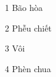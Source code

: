 \begin{loigiaiexh}{1}
 Bão hòa 
\end{loigiaiexh}
\begin{loigiaiexh}{2}
 Phễu chiết 
\end{loigiaiexh}
\begin{loigiaiexh}{3}
 Vôi 
\end{loigiaiexh}
\begin{loigiaiexh}{4}
 Phèn chua 
\end{loigiaiexh}
